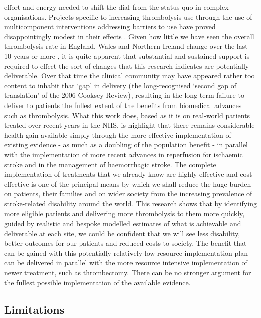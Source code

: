 effort and energy needed to shift the dial from the status quo in complex organisations. Projects specific to increasing thrombolysis use through the use of multicomponent interventions addressing barriers to use have proved disappointingly modest in their effects  \cite{scott_multilevel_2013}. Given how little we have seen the overall thrombolysis rate in England, Wales and Northern Ireland change over the last 10 years or more \cite{sentinel_national_stroke_audit_programme_ssnap_2023}, it is quite apparent that substantial and sustained support is required to effect the sort of changes that this research indicates are potentially deliverable. Over that time the clinical community may have appeared rather too content to inhabit that ‘gap’ in delivery (the long-recognised ‘second gap of translation’ of the 2006 Cooksey Review\cite{cooksey_review_2006}), resulting in the long term failure to deliver to patients the fullest extent of the benefits from biomedical advances such as thrombolysis. What this work does, based as it is on real-world patients treated over recent years in the NHS, is highlight that there remains considerable health gain available simply through the more effective implementation of existing evidence - as much as a doubling of the population benefit - in parallel with the implementation of more recent advances in reperfusion for ischaemic stroke and in the management of haemorrhagic stroke. The complete implementation of treatments that we already know are highly effective and cost-effective is one of the principal means by which we shall reduce the huge burden on patients, their families and on wider society from the increasing prevalence of stroke-related disability around the world. This research shows that by identifying more eligible patients and delivering more thrombolysis to them more quickly, guided by realistic and bespoke modelled estimates of what is achievable and deliverable at each site, we could be confident that we will see less disability, better outcomes for our patients and reduced costs to society. The benefit that can be gained with this potentially relatively low resource implementation plan can be delivered in parallel with the more resource intensive implementation of newer treatment, such as thrombectomy. There can be no stronger argument for the fullest possible implementation of the available evidence.

\subsection{Limitations}


